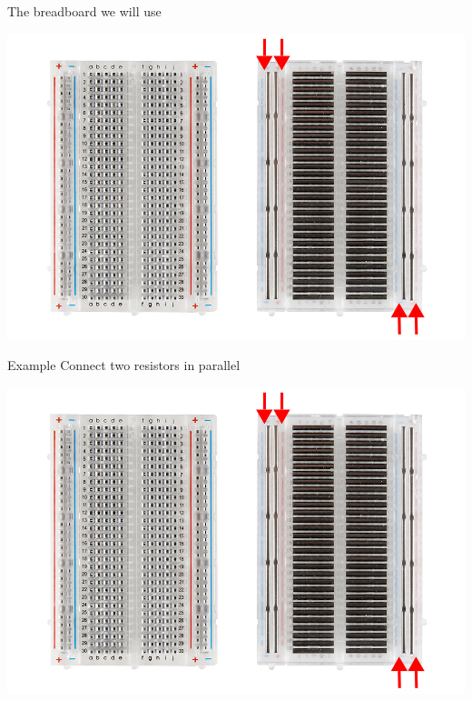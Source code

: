 \documentclass[aspectratio=1610]{beamer}
\begin{document}

\begin{frame}[plain,t]{The breadboard we will use}

\begin{center}
\includegraphics[width=.9\textwidth]{figs/1-breadboard.jpg}
\end{center}
\end{frame}



\begin{frame}[plain,t]{Example}
Connect two resistors in parallel

\bigskip
\begin{center}
\includegraphics[width=.9\textwidth]{figs/1-breadboard.jpg}
\end{center}
\end{frame}

\end{document}
